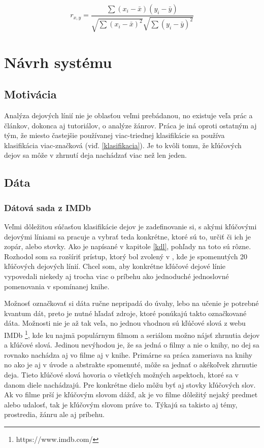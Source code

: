 \begin{equation}
	r_{x,y} =  \dfrac{\sum{(x_{i}-\bar{x})(y_{i}-\bar{y})}}{\sqrt{\sum{(x_{i}-\bar{x})^2}} \sqrt{\sum{(y_{i}-\bar{y})^2}}} \label{rovnicaSpearman}
\end{equation}


\chapter{Návrh systému}
\label{navrh}


\section{Motivácia}

Analýza dejových línií nie je oblasťou veľmi prebádanou, no existuje veľa prác a článkov, dokonca aj tutoriálov, o analýze žánrov. Práca je iná oproti ostatným aj tým, že miesto častejšie používanej viac-triednej klasifikácie sa používa klasifikácia viac-značková (viď. \ref{klasifikacia}). Je to kvôli tomu, že kľúčových dejov sa môže v zhrnutí deja nachádzať viac než len jeden.

\section{Dáta}

\subsection{Dátová sada z IMDb}
Veľmi dôležitou súčasťou klasifikácie dejov je zadefinovanie si, s akými kľúčovými dejovými líniami sa pracuje a vybrať teda konkrétne, ktoré sú to, určiť či ich je zopár, alebo stovky. Ako je napísané v kapitole \ref{kdl}, pohľady na toto sú rôzne. Rozhodol som sa rozšíriť prístup, ktorý bol zvolený v \cite{Tobias:1993}, kde je spomenutých 20 kľúčových dejových línií. Chcel som, aby konkrétne kľúčové dejové línie vypovedali niekedy aj trocha viac o príbehu ako jednoduché jednoslovné pomenovania v spomínanej knihe.

Možnosť označkovať si dáta ručne nepripadá do úvahy, lebo na učenie je potrebné kvantum dát, preto je nutné hľadať zdroje, ktoré ponúkajú takto označkované dáta. Možnosti nie je až tak veľa, no jednou vhodnou sú kľúčové slová z webu IMDb \footnote{https://www.imdb.com/}, kde ku najmä populárnym filmom a seriálom možno nájsť zhrnutia dejov a kľúčové slová. Jedinou nevýhodou je, že sa jedná o filmy a nie o knihy, no dej sa rovnako nachádza aj vo filme aj v knihe. Primárne sa práca zameriava na knihy no ako je aj v úvode a abstrakte spomenuté, môže sa jednať o akékoľvek zhrnutie deja. Tieto kľúčové slová hovoria o všetkých možných aspektoch, ktoré sa v danom diele nachádzajú. Pre konkrétne dielo môžu byť aj stovky kľúčových slov. Ak vo filme prší je kľúčovým slovom dážď, ak je vo filme dôležitý nejaký predmet alebo udalosť, tak je kľúčovým slovom práve to. Týkajú sa takisto aj témy, prostredia, žánru ale aj príbehu.

